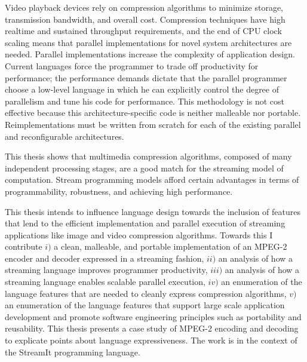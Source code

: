 Video playback devices rely on compression 
algorithms to minimize storage, transmission bandwidth, and overall cost. 
Compression techniques have high realtime and sustained
throughput requirements, and the end of CPU clock scaling 
means that parallel implementations
for novel system architectures are needed. Parallel implementations
increase the complexity of application design.
Current languages force the programmer to trade off productivity for
performance;
the performance demands dictate that the parallel programmer
choose a low-level language in which he can explicitly 
control the degree of parallelism and tune his code for performance. 
This methodology is not cost effective because this architecture-specific code is 
neither malleable nor portable. 
Reimplementations must be written from scratch for each of the 
existing 
parallel and reconfigurable architectures.

This thesis shows that multimedia compression algorithms, composed of many 
independent processing stages, are a good match for the streaming model of computation.
Stream programming models afford certain advantages in terms of programmability, robustness, 
and achieving high performance. 

This thesis intends to influence language design towards the inclusion of
features that lend to the efficient implementation and parallel 
execution of streaming applications like image and video compression algorithms. 
Towards this I contribute $i)$ a clean, malleable, and portable implementation of an 
MPEG-2 encoder and decoder expressed in a streaming fashion, $ii)$ an 
analysis of how a streaming language improves programmer productivity, $iii)$ an 
analysis of how a streaming language enables scalable parallel execution, $iv)$
an enumeration of the language features that are needed to cleanly express
compression algorithms, $v)$ an enumeration of the language features that 
support large scale application development and promote software engineering
principles such as portability and reusability.
This thesis presents a case study of MPEG-2 encoding and decoding
to explicate points about language expressiveness. 
The work is in the context of the StreamIt programming language.


